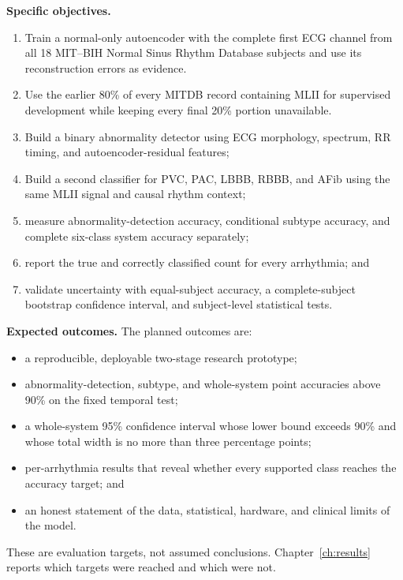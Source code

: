 \textbf{Specific objectives.}
\begin{enumerate}
    \item Train a normal-only autoencoder with the complete first ECG channel
    from all 18 MIT--BIH Normal Sinus Rhythm Database subjects and use its
    reconstruction errors as evidence.
    \item Use the earlier 80\% of every MITDB record containing MLII for
    supervised development while keeping every final 20\% portion unavailable.
    \item Build a binary abnormality detector using ECG morphology, spectrum,
    RR timing, and autoencoder-residual features;
    \item Build a second classifier for PVC, PAC, LBBB, RBBB, and AFib using
    the same MLII signal and causal rhythm context;
    \item measure abnormality-detection accuracy, conditional subtype accuracy,
    and complete six-class system accuracy separately;
    \item report the true and correctly classified count for every arrhythmia;
    and
    \item validate uncertainty with equal-subject accuracy, a complete-subject
    bootstrap confidence interval, and subject-level statistical tests.
\end{enumerate}

\textbf{Expected outcomes.}
The planned outcomes are:
\begin{itemize}
    \item a reproducible, deployable two-stage research prototype;
    \item abnormality-detection, subtype, and whole-system point accuracies
    above 90\% on the fixed temporal test;
    \item a whole-system 95\% confidence interval whose lower bound exceeds
    90\% and whose total width is no more than three percentage points;
    \item per-arrhythmia results that reveal whether every supported class
    reaches the accuracy target; and
    \item an honest statement of the data, statistical, hardware, and clinical
    limits of the model.
\end{itemize}

These are evaluation targets, not assumed conclusions. Chapter~\ref{ch:results}
reports which targets were reached and which were not.
